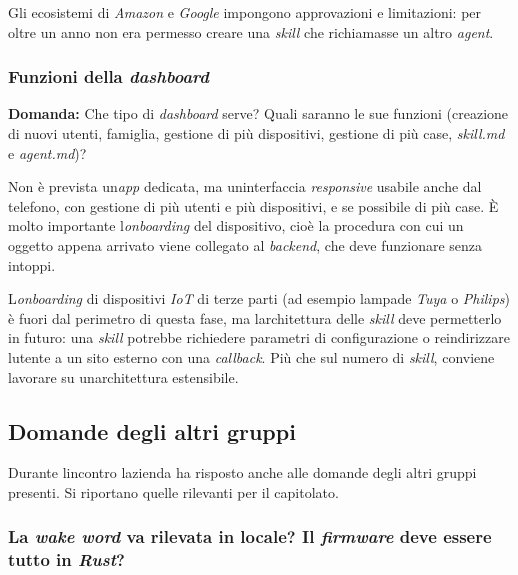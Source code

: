 \documentclass[12pt,a4paper]{article}
\begin{document}
Gli ecosistemi di \emph{Amazon} e \emph{Google} impongono approvazioni e limitazioni: per oltre un anno non era permesso creare una \emph{skill} che richiamasse un altro \emph{agent}.

\hypertarget{funzioni-della-dashboard}{%
\subsubsection{\texorpdfstring{Funzioni della \emph{dashboard}}{Funzioni della dashboard}}}

\textbf{Domanda:} Che tipo di \emph{dashboard} serve? Quali saranno le sue funzioni (creazione di nuovi utenti, famiglia, gestione di più dispositivi, gestione di più case, \emph{skill.md} e \emph{agent.md})?

Non è prevista un\textquotesingle{}\emph{app} dedicata, ma un\textquotesingle interfaccia \emph{responsive} usabile anche dal telefono, con gestione di più utenti e più dispositivi, e se possibile di più case. È molto importante l\textquotesingle{}\emph{onboarding} del dispositivo, cioè la procedura con cui un oggetto appena arrivato viene collegato al \emph{backend}, che deve funzionare senza intoppi.

L\textquotesingle{}\emph{onboarding} di dispositivi \emph{IoT} di terze parti (ad esempio lampade \emph{Tuya} o \emph{Philips}) è fuori dal perimetro di questa fase, ma l\textquotesingle architettura delle \emph{skill} deve permetterlo in futuro: una \emph{skill} potrebbe richiedere parametri di configurazione o reindirizzare l\textquotesingle utente a un sito esterno con una \emph{callback}. Più che sul numero di \emph{skill}, conviene lavorare su un\textquotesingle architettura estensibile.

\hypertarget{domande-degli-altri-gruppi}{%
\subsection{Domande degli altri gruppi}}

Durante l\textquotesingle incontro l\textquotesingle azienda ha risposto anche alle domande degli altri gruppi presenti. Si riportano quelle rilevanti per il capitolato.

\hypertarget{la-wake-word-va-rilevata-in-locale-il-firmware-deve-essere-tutto-in-rust}{%
\subsubsection{\texorpdfstring{La \emph{wake word} va rilevata in locale? Il \emph{firmware} deve essere tutto in \emph{Rust}?}{La wake word va rilevata in locale? Il firmware deve essere tutto in Rust?}}}
\end{document}
